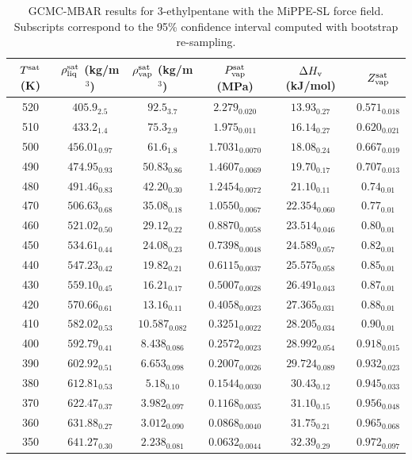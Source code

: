 \documentclass[journal=jctc,manuscript=article]{achemso}
\begin{document}
\begin{table}[htb!]
	\caption{GCMC-MBAR results for 3-ethylpentane with the MiPPE-SL force field. Subscripts correspond to the 95\% confidence interval computed with bootstrap re-sampling.}
	\begin{center}
		\begin{tabular}{|c|c|c|c|c|c|}
			\hline
			$T^{\rm sat}$ (K) & $\rho_{\rm liq}^{\rm sat}$ (kg/m$^3$) & $\rho_{\rm vap}^{\rm sat}$ (kg/m$^3$) & $P_{\rm vap}^{\rm sat}$ (MPa) & $\Delta H_{\rm v}$ (kJ/mol) & $Z_{\rm vap}^{\rm sat}$ \\ \hline
			520 & $405.9_{2.5}$ & $92.5_{3.7}$ & $2.279_{0.020}$ & $13.93_{0.27}$ & $0.571_{0.018}$ \\
			510 & $433.2_{1.4}$ & $75.3_{2.9}$ & $1.975_{0.011}$ & $16.14_{0.27}$ & $0.620_{0.021}$ \\
			500 & $456.01_{0.97}$ & $61.6_{1.8}$ & $1.7031_{0.0070}$ & $18.08_{0.24}$ & $0.667_{0.019}$ \\
			490 & $474.95_{0.93}$ & $50.83_{0.86}$ & $1.4607_{0.0069}$ & $19.70_{0.17}$ & $0.707_{0.013}$ \\
			480 & $491.46_{0.83}$ & $42.20_{0.30}$ & $1.2454_{0.0072}$ & $21.10_{0.11}$ & $0.74_{0.01}$ \\
			470 & $506.63_{0.68}$ & $35.08_{0.18}$ & $1.0550_{0.0067}$ & $22.354_{0.060}$ & $0.77_{0.01}$ \\
			460 & $521.02_{0.50}$ & $29.12_{0.22}$ & $0.8870_{0.0058}$ & $23.514_{0.046}$ & $0.80_{0.01}$ \\
			450 & $534.61_{0.44}$ & $24.08_{0.23}$ & $0.7398_{0.0048}$ & $24.589_{0.057}$ & $0.82_{0.01}$ \\
			440 & $547.23_{0.42}$ & $19.82_{0.21}$ & $0.6115_{0.0037}$ & $25.575_{0.058}$ & $0.85_{0.01}$ \\
			430 & $559.10_{0.45}$ & $16.21_{0.17}$ & $0.5007_{0.0028}$ & $26.491_{0.043}$ & $0.87_{0.01}$ \\
			420 & $570.66_{0.61}$ & $13.16_{0.11}$ & $0.4058_{0.0023}$ & $27.365_{0.031}$ & $0.88_{0.01}$ \\
			410 & $582.02_{0.53}$ & $10.587_{0.082}$ & $0.3251_{0.0022}$ & $28.205_{0.034}$ & $0.90_{0.01}$ \\
			400 & $592.79_{0.41}$ & $8.438_{0.086}$ & $0.2572_{0.0023}$ & $28.992_{0.054}$ & $0.918_{0.015}$ \\
			390 & $602.92_{0.51}$ & $6.653_{0.098}$ & $0.2007_{0.0026}$ & $29.724_{0.089}$ & $0.932_{0.023}$ \\
			380 & $612.81_{0.53}$ & $5.18_{0.10}$ & $0.1544_{0.0030}$ & $30.43_{0.12}$ & $0.945_{0.033}$ \\
			370 & $622.47_{0.37}$ & $3.982_{0.097}$ & $0.1168_{0.0035}$ & $31.10_{0.15}$ & $0.956_{0.048}$ \\
			360 & $631.88_{0.27}$ & $3.012_{0.090}$ & $0.0868_{0.0040}$ & $31.75_{0.21}$ & $0.965_{0.068}$ \\
			350 & $641.27_{0.30}$ & $2.238_{0.081}$ & $0.0632_{0.0044}$ & $32.39_{0.29}$ & $0.972_{0.097}$ \\
			\hline
		\end{tabular}
	\end{center}
\end{table}
\end{document}

